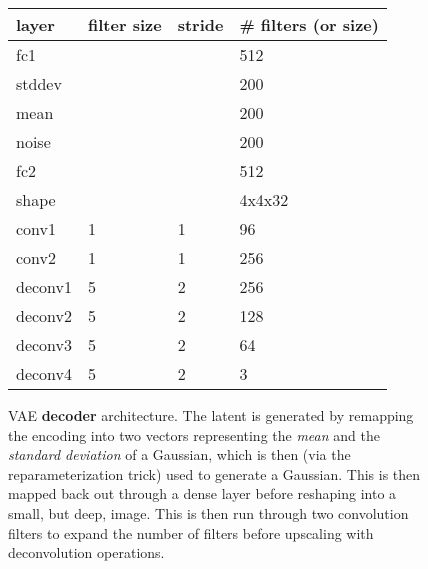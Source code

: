 \documentclass[twoside,11pt,a4paper]{article}
\begin{document}
\begin{figure}
\begin{center}
    \begin{tabular}{l||l|l|l}
      layer & filter size & stride & \# filters (or size) \\
      \hline
      fc1 & & & 512 \\
      stddev & & & 200 \\
      mean & & & 200 \\
      noise & & & 200 \\
      fc2 & & & 512 \\
      shape & & & 4x4x32\\
      \hline
      conv1 & 1 & 1 & 96 \\
      conv2 & 1 & 1 & 256 \\
      \hline
      deconv1 & 5 & 2 & 256 \\
      deconv2 & 5 & 2 & 128 \\
      deconv3 & 5 & 2 & 64 \\            
      deconv4 & 5 & 2 & 3 \\     
      
    \end{tabular}

    
  \end{center}
  \caption{VAE \textbf{decoder} architecture. The latent is generated by remapping the encoding into two vectors representing the \emph{mean} and the \emph{standard deviation} of a Gaussian, which is then (via the reparameterization trick) used to generate a Gaussian. This is then mapped back out through a dense layer before reshaping into a small, but deep, image. This is then run through two convolution filters to expand the number of filters before upscaling with deconvolution operations.}
\end{figure}
\end{document}
